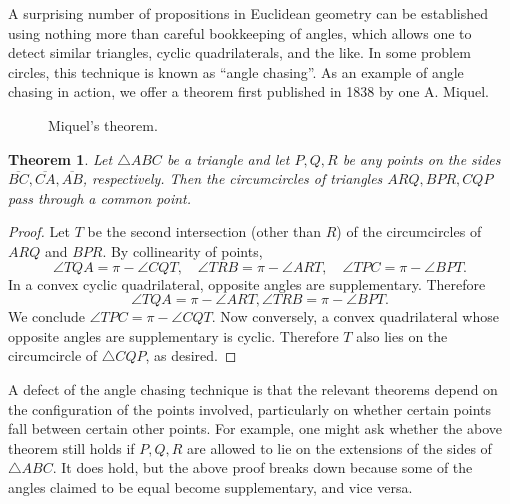 \documentclass[12pt]{book}
\numberwithin{exc}{section}
\numberwithin{figure}{section}
\newtheorem{theorem}{Theorem}[section]
\numberwithin{equation}{theorem}
\def\seg#1{\overline{#1}}
\begin{document}
A surprising number of propositions in Euclidean geometry can be 
established using nothing more than careful 
bookkeeping of angles, which allows one to detect similar triangles, 
cyclic quadrilaterals, and the like. In some problem circles, this
technique is known as ``angle chasing''. 
As an example of angle chasing in action, we offer a theorem 
first published in 1838 by one A. Miquel. 
\begin{figure}[ht]
\caption{Miquel's theorem.}
\label{fig:miquel}
\end{figure}
\begin{theorem}
Let $\triangle ABC$ be a triangle and let $P,Q,R$ be any points on the sides 
$\seg{BC}, \seg{CA}, \seg{AB}$, 
respectively. Then the circumcircles of triangles $ARQ, BPR, 
CQP$ pass through a common point.
\end{theorem}
\begin{proof}
Let $T$ be the second intersection (other than $R$)
of the circumcircles of $ARQ$ and $BPR$. 
By collinearity of points,
\[
\angle TQA = \pi - \angle CQT, \quad
\angle TRB = \pi - \angle ART, \quad
\angle TPC = \pi - \angle BPT.
\]
In a convex cyclic quadrilateral, opposite angles are supplementary. 
Therefore
\[
\angle TQA = \pi - \angle ART,
\angle TRB = \pi - \angle BPT.
\]
We conclude $\angle TPC = \pi - \angle CQT$. Now conversely, a 
convex quadrilateral whose opposite angles are supplementary is cyclic. 
Therefore $T$ also lies on the circumcircle of $\triangle CQP$, as desired.
\end{proof}

A defect of the angle chasing technique is that 
the relevant theorems depend on the configuration of the points 
involved, particularly on whether certain points fall between 
certain other points. For example, one might ask whether the above 
theorem still holds if $P,Q,R$ are allowed to lie on the extensions 
of the sides of $\triangle ABC$. It does hold, but the above proof breaks down 
because some of the angles claimed to be equal become supplementary, 
and vice versa. 
\end{document}
